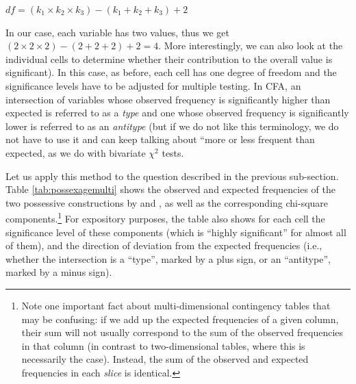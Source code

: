 \begin{exe}
\ex
$df = (k_1 \times k_2 \times k_3) - (k_1 + k_2 + k_3) + 2$
\label{ex:degreesoffreedom3D}
\end{exe}

In our case, each variable has two values, thus we get $(2 \times 2 \times 2) - (2 + 2 + 2) + 2 = 4$. More interestingly, we can also look at the individual cells to determine whether their contribution to the overall value is significant). In this case, as before, each cell has one degree of freedom and the significance levels have to be adjusted for multiple testing. In CFA, an intersection of variables whose observed frequency is significantly higher than expected is referred to as a \textit{type} and one whose observed frequency is significantly lower is referred to as an \textit{antitype} (but if we do not like this terminology, we do not have to use it and can keep talking about ``more or less frequent than expected, as we do with bivariate $\chi^2$ tests.

Let us apply this method to the question described in the previous sub-section. Table \ref{tab:possexagemulti} shows the observed and expected frequencies of the two possessive constructions by  and , as well as the corresponding chi-square components.\footnote{Note one important fact about multi-dimensional contingency tables that may be confusing: if we add up the expected frequencies of a given column, their sum will not usually correspond to the sum of the observed frequencies in that column (in contrast to two-dimensional tables, where this is necessarily the case). Instead, the sum of the observed and expected frequencies in each \textit{slice} is identical.} For expository purposes, the table also shows for each cell the significance level of these components (which is ``highly significant'' for almost all of them), and the direction of deviation from the expected frequencies (i.e., whether the intersection is a ``type'', marked by a plus sign, or an ``antitype'', marked by a minus sign).

